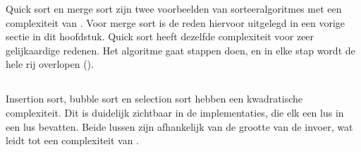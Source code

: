 Quick sort en merge sort zijn twee voorbeelden van sorteeralgoritmes met een complexiteit van \compnln. Voor merge sort is de reden hiervoor uitgelegd in een vorige sectie in dit hoofdstuk. Quick sort heeft dezelfde complexiteit voor zeer gelijkaardige redenen. Het algoritme gaat \compln stappen doen, en in elke stap wordt de hele rij overlopen (\compn).

\subsection{\compnk}

Insertion sort, bubble sort en selection sort hebben een kwadratische complexiteit. Dit is duidelijk zichtbaar in de implementaties, die elk een lus in een lus bevatten. Beide lussen zijn afhankelijk van de grootte van de invoer, wat leidt tot een complexiteit van \compnk.

